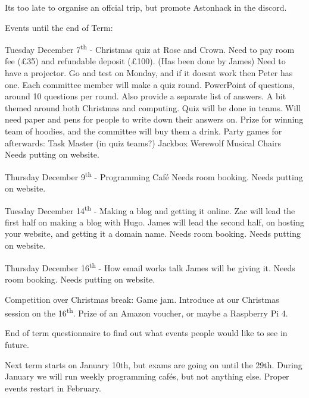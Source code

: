 \documentclass[11pt,hacksoc]{meetingmins}
\begin{document}
\begin{items}

\item Its too late to organise an offcial trip, but promote Astonhack in the discord.

\vspace{1.5em}
Events until the end of Term:
  \item Tuesday December 7\textsuperscript{th} - Christmas quiz at Rose and Crown.
  \subitem Need to pay room fee (\pounds35) and refundable deposit (\pounds100). (Has been done by James)
  \subitem Need to have a projector. Go and test on Monday, and if it doesnt work then Peter has one.
  \subitem Each committee member will make a quiz round.
  \subsubitem PowerPoint of questions, around 10 questions per round.
  \subsubitem Also provide a separate list of answers.
  \subsubitem A bit themed around both Christmas and computing.
  \subitem Quiz will be done in teams.
  \subsubitem Will need paper and pens for people to write down their answers on.
  \subitem Prize for winning team of hoodies, and the committee will buy them a drink.
  \subitem Party games for afterwards:
  \subsubitem Task Master (in quiz teams?)
  \subsubitem Jackbox
  \subsubitem Werewolf
  \subsubitem Musical Chairs
  \subitem Needs putting on website.
  \item Thursday December 9\textsuperscript{th} - Programming Café
  \subitem Needs room booking.
  \subitem Needs putting on website.
  \item Tuesday December 14\textsuperscript{th} - Making a blog and getting it online.
  \subitem Zac will lead the first half on making a blog with Hugo.
  \subitem James will lead the second half, on hosting your website, and getting it a domain name.
  \subitem Needs room booking.
  \subitem Needs putting on website.
  \item Thursday December 16\textsuperscript{th} - How email works talk
  \subitem James will be giving it.
  \subitem Needs room booking.
  \subitem Needs putting on website.

\item Competition over Christmas break:
\subitem Game jam.
\subitem Introduce at our Christmas session on the 16\textsuperscript{th}.
\subitem Prize of an Amazon voucher, or maybe a Raspberry Pi 4.

\item End of term questionnaire to find out what events people would like to see in future.

\item Next term starts on January 10th, but exams are going on until the 29th.
\subitem During January we will run weekly programming cafés, but not anything else.
\subitem Proper events restart in February.


\end{items}
\end{document}
